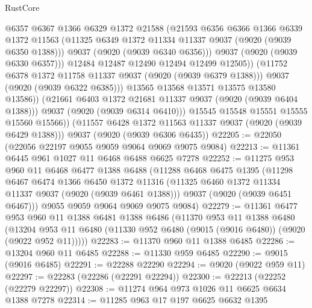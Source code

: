 \begin{lexlean}{RustCore}
\begin{coremodule}
                      @6357
                      @6367
                      @1366
                      @6329
                      @1372
                      @21588
                      (@21593
                        @6356
                        @6366
                        @1366
                        @6339
                        @1372
                        @11563
                        (@11325 @6349 @1372 @11334 @11337 @9037 (@9020 (@9039 @6350 @1388)))
                        @9037
                        (@9020 (@9039 @6340 @6356)))
                      @9037
                      (@9020 (@9039 @6330 @6357)))
                    @12484
                    @12487
                    @12490
                    @12494
                    @12499
                    @12505))
                (@11752 @6378 @1372 @11758 @11337 @9037 (@9020 (@9039 @6379 @1388)))
                @9037
                (@9020 (@9039 @6322 @6385)))
              @13565
              @13568
              @13571
              @13575
              @13580
              @13586))
          (@21661 @6403 @1372 @21681 @11337 @9037 (@9020 (@9039 @6404 @1388)))
          @9037
          (@9020 (@9039 @6314 @6410)))
        @15545
        @15548
        @15551
        @15555
        @15560
        @15566))
    (@11557 @6428 @1372 @11563 @11337 @9037 (@9020 (@9039 @6429 @1388)))
    @9037
    (@9020 (@9039 @6306 @6435))
@22205 := @22050 (@22056 @22197 @9055 @9059 @9064 @9069 @9075 @9084)
@22213 := @11361 @6445 @961 @1027 @11 @6468 @6488 @6625 @7278
@22252 := @11275
    @953
    @960
    @11
    @6468
    @6477
    @1388
    @6488
    (@11288
      @6468
      @6475
      @1395
      (@11298
        @6467
        @6474
        @1366
        @6450
        @1372
        @11316
        (@11325 @6460 @1372 @11334 @11337 @9037 (@9020 (@9039 @6461 @1388)))
        @9037
        (@9020 (@9039 @6451 @6467)))
      @9055
      @9059
      @9064
      @9069
      @9075
      @9084)
@22279 := @11361
    @6477
    @953
    @960
    @11
    @1388
    @6481
    @1388
    @6486
    (@11370
      @953
      @11
      @1388
      @6480
      (@13204 @953 @11 @6480 (@11330 @952 @6480 (@9015 (@9016 @6480)) (@9020 (@9022 @952 @11)))))
@22283 := @11370 @960 @11 @1388 @6485
@22286 := @13204 @960 @11 @6485
@22288 := @11330 @959 @6485
@22290 := @9015 (@9016 @6485)
@22291 := @22288 @22290
@22294 := @9020 (@9022 @959 @11)
@22297 := @22283 (@22286 (@22291 @22294))
@22300 := @22213 (@22252 (@22279 @22297))
@22308 := @11274 @964 @973 @1026 @11 @6625 @6634 @1388 @7278
@22314 := @11285 @963 @17 @197 @6625 @6632 @1395

\end{coremodule}
\end{lexlean}
